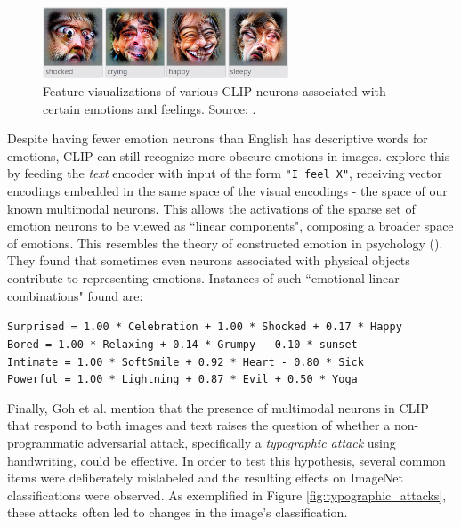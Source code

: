 \documentclass{article}
\begin{document}
\begin{figure}[ht!]
    \begin{center}
        \includegraphics[width=0.65\textwidth]{figures/emotion_neurons.png}
    \end{center}
    \caption{
        Feature visualizations of various CLIP neurons associated with certain emotions and feelings. Source: \citet{radford2021clip}.
    }
    \label{fig:emotion_neurons}
\end{figure}

\medskip
\noindent
Despite having fewer emotion neurons than English has descriptive words for emotions, CLIP can still recognize more obscure emotions in images. \citet{goh2021multimodal} explore this by feeding the \emph{text} encoder with input of the form \texttt{"I feel X"}, receiving vector encodings embedded in the same space of the visual encodings - the space of our known multimodal neurons. This allows the activations of the sparse set of emotion neurons to be viewed as ``linear components", composing a broader space of emotions. This resembles the theory of constructed emotion in psychology (\citet{barrett2017theory}). They found that sometimes even neurons associated with physical objects contribute to representing emotions. Instances of such ``emotional linear combinations" found are:
\begin{center}
    \texttt{Surprised = 1.00 * Celebration + 1.00 * Shocked + 0.17 * Happy} \\
    \texttt{Bored = 1.00 * Relaxing + 0.14 * Grumpy - 0.10 * sunset} \\
    \texttt{Intimate = 1.00 * SoftSmile + 0.92 * Heart - 0.80 * Sick} \\
    \texttt{Powerful = 1.00 * Lightning + 0.87 * Evil + 0.50 * Yoga}
\end{center}

\medskip
\noindent
Finally, Goh et al. mention that the presence of multimodal neurons in CLIP that respond to both images and text raises the question of whether a non-programmatic adversarial attack, specifically a \emph{typographic attack} using handwriting, could be effective. In order to test this hypothesis, several common items were deliberately mislabeled and the resulting effects on ImageNet classifications were observed. As exemplified in Figure \ref{fig:typographic_attacks}, these attacks often led to changes in the image's classification.
\end{document}
